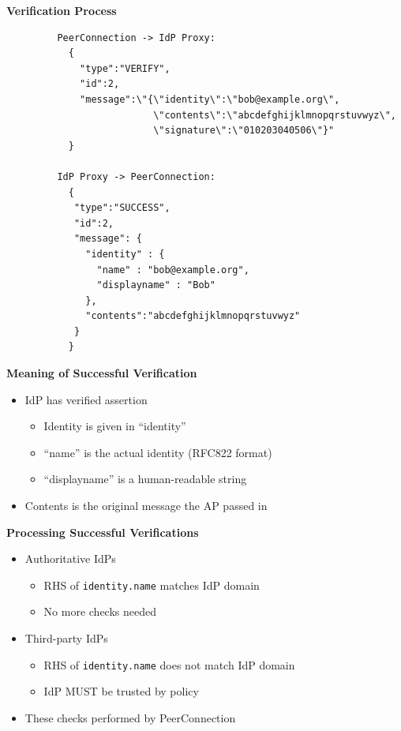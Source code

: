 \documentclass[helvetica]{seminar}
\newcommand{\heading}[1]{%
  \begin{center} 
    \large\bf 
    #1 
  \end{center} 
  \vspace{.4 in}}
\begin{document}
\begin{slide}
\heading{Verification Process}

\begin{tiny}
\begin{verbatim}
         PeerConnection -> IdP Proxy:
           {
             "type":"VERIFY",
             "id":2,
             "message":\"{\"identity\":\"bob@example.org\",
                          \"contents\":\"abcdefghijklmnopqrstuvwyz\",
                          \"signature\":\"010203040506\"}"
           }

         IdP Proxy -> PeerConnection:
           {
            "type":"SUCCESS",
            "id":2,
            "message": {
              "identity" : {
                "name" : "bob@example.org",
                "displayname" : "Bob"
              },
              "contents":"abcdefghijklmnopqrstuvwyz"
            }
           }
\end{verbatim}
\end{tiny}

\end{slide}


\begin{slide}
\heading{Meaning of Successful Verification}

\begin{itemize}
\item IdP has verified assertion
  \begin{itemize}
  \item Identity is given in ``identity''
  \item ``name'' is the actual identity (RFC822 format)
  \item ``displayname'' is a human-readable string
  \end{itemize}

\item Contents is the original message the AP passed in
\end{itemize}

\end{slide}


\begin{slide}
\heading{Processing Successful Verifications}

\begin{itemize}
\item Authoritative IdPs
  \begin{itemize}
  \item RHS of \verb^identity.name^ matches IdP domain
  \item No more checks needed
  \end{itemize}

\item Third-party IdPs
  \begin{itemize}
  \item RHS of \verb^identity.name^ does not match IdP domain
  \item IdP MUST be trusted by policy
  \end{itemize}

\item These checks performed by PeerConnection
\end{itemize}

\end{slide}
\end{document}
